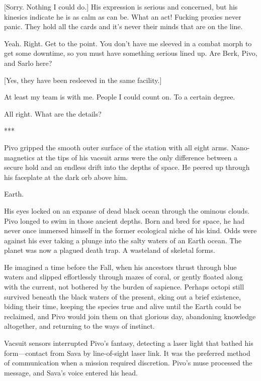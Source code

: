 [Sorry. Nothing I could do.] His expression is serious and concerned, but his kinesics indicate he is as calm as can be. What an act! Fucking proxies never panic. They hold all the cards and it's never their minds that are on the line.

Yeah. Right. Get to the point. You don't have me sleeved in a combat morph to get some downtime, so you must have something serious lined up. Are Berk, Pivo, and Sarlo here?

[Yes, they have been resleeved in the same facility.]

At least my team is with me. People I could count on. To a certain degree.

All right. What are the details?

\begin{center}
***
\end{center}

Pivo gripped the smooth outer surface of the station with all eight arms. Nano-magnetics at the tips of his vacsuit arms were the only difference between a secure hold and an endless drift into the depths of space. He peered up through his faceplate at the dark orb above him.

Earth.

His eyes locked on an expanse of dead black ocean through the ominous clouds. Pivo longed to swim in those ancient depths. Born and bred for space, he had never once immersed himself in the former ecological niche of his kind. Odds were against his ever taking a plunge into the salty waters of an Earth ocean. The planet was now a plagued death trap. A wasteland of skeletal forms.

He imagined a time before the Fall, when his ancestors thrust through blue waters and slipped effortlessly through mazes of coral, or gently floated along with the current, not bothered by the burden of sapience. Perhaps octopi still survived beneath the black waters of the present, eking out a brief existence, biding their time, keeping the species true and alive until the Earth could be reclaimed, and Pivo would join them on that glorious day, abandoning knowledge altogether, and returning to the ways of instinct.

Vacsuit sensors interrupted Pivo's fantasy, detecting a laser light that bathed his form—contact from Sava by line-of-sight laser link. It was the preferred method of communication when a mission required discretion. Pivo's muse processed the message, and Sava's voice entered his head.

